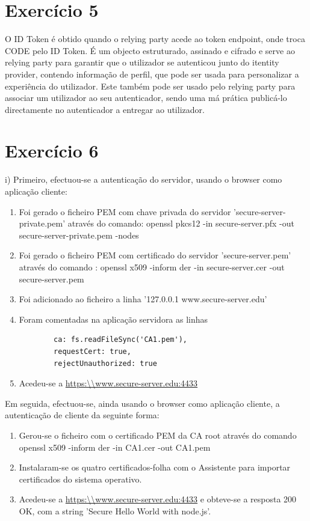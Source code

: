 \documentclass[11pt]{report}
\begin{document}
\section{Exercício 5}
	O ID Token é obtido quando o relying party acede ao token endpoint, onde troca CODE pelo ID Token.
	É um objecto estruturado, assinado e cifrado e serve ao relying party para garantir que o utilizador se autenticou junto do itentity provider, contendo informação de perfil, que pode ser usada para personalizar a experiência do utilizador.
	Este também pode ser usado pelo relying party para associar um utilizador ao seu autenticador, sendo uma má prática publicá-lo directamente no autenticador a entregar ao utilizador.

\section{Exercício 6}
	i) 	Primeiro, efectuou-se a autenticação do servidor, usando o browser como aplicação cliente:
	\begin{enumerate}
		\item Foi gerado o ficheiro PEM com chave privada do servidor 'secure-server-private.pem' através do comando: openssl pkcs12 -in secure-server.pfx -out secure-server-private.pem -nodes
		\item Foi gerado o ficheiro PEM com certificado do servidor 'secure-server.pem' através do comando : openssl x509 -inform der -in secure-server.cer -out secure-server.pem
		\item Foi adicionado ao ficheiro  a linha '127.0.0.1 www.secure-server.edu'
		\item Foram comentadas na aplicação servidora as linhas
		\begin{lstlisting}
		ca: fs.readFileSync('CA1.pem'), 
		requestCert: true, 
		rejectUnauthorized: true 
		\end{lstlisting}
		\item Acedeu-se a \url{https:\\www.secure-server.edu:4433}
	\end{enumerate}
	Em seguida, efectuou-se, ainda usando o browser como aplicação cliente, a autenticação de cliente da seguinte forma:
	\begin{enumerate}
		\item Gerou-se o ficheiro com o certificado PEM da CA root através do comando openssl x509 -inform der -in CA1.cer -out CA1.pem
		\item Instalaram-se os quatro certificados-folha com o Assistente para importar certificados do sistema operativo.
		\item Acedeu-se a \url{https:\\www.secure-server.edu:4433} e obteve-se a resposta 200 OK, com a string 'Secure Hello World with node.js'.
	\end{enumerate}
\end{document}
